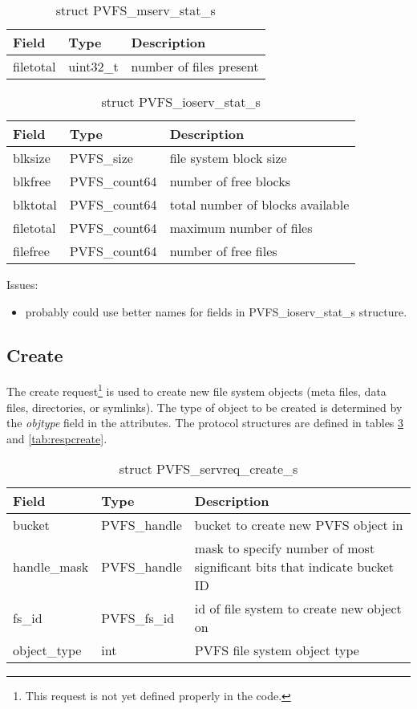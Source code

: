 \documentclass[11pt, letterpaper]{article} %
\begin{document}
\begin{table}[H]
\begin{tabular}{|l|l|l|}
\hline
Field & Type & Description \\
\hline
filetotal & uint32\_t & number of files present\\
\hline
\end{tabular}
\caption{struct PVFS\_mserv\_stat\_s \label{tab:mservstat}}
\end{table}


\begin{table}[H]
\begin{tabular}{|l|l|l|}
\hline
Field & Type & Description \\
\hline
\hline
blksize & PVFS\_size & file system block size\\
\hline
blkfree & PVFS\_count64 & number of free blocks\\
\hline
blktotal & PVFS\_count64 & total number of blocks available\\
\hline
filetotal & PVFS\_count64 & maximum number of files\\
\hline
filefree & PVFS\_count64 & number of free files\\
\hline
\end{tabular}
\caption{struct PVFS\_ioserv\_stat\_s \label{tab:ioservstat}}
\end{table}

Issues:
\begin{itemize}
\item probably could use better names for fields in
PVFS\_ioserv\_stat\_s structure.
\end{itemize}

\subsection{Create}

The create request\footnote{This request is not yet defined properly in
the code.}
is used to create new file system objects (meta
files, data files, directories, or symlinks).  The type of object to be
created is determined by the \emph{objtype} field in the attributes.
The protocol structures
are defined in tables \ref{tab:reqcreate} and \ref{tab:respcreate}.

\begin{table}[H]
\begin{tabular}{|l|l|l|}
\hline
Field & Type & Description \\
\hline
\hline
bucket & PVFS\_handle & bucket to create new PVFS object in\\
\hline
handle\_mask & PVFS\_handle & mask to specify number of most significant
bits that indicate bucket ID\\
\hline
fs\_id & PVFS\_fs\_id & id of file system to create new object on\\
\hline
object\_type & int & PVFS file system object type\\
\hline
\end{tabular}
\caption{struct PVFS\_servreq\_create\_s \label{tab:reqcreate}}
\end{table}
\end{document}
